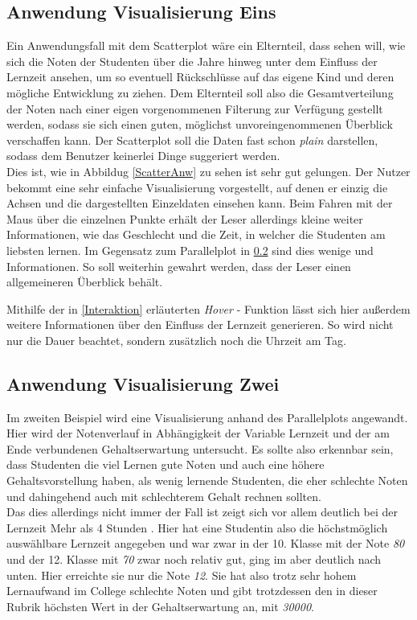 \documentclass[usegeometry=true]{scrartcl}
\begin{document}
\subsection{Anwendung Visualisierung Eins}
\label{AnwEins}
Ein Anwendungsfall mit dem Scatterplot wäre ein Elternteil, dass sehen will, wie sich die Noten der Studenten über die Jahre hinweg unter dem Einfluss der Lernzeit ansehen, um so eventuell Rückschlüsse auf das eigene Kind und deren mögliche Entwicklung zu ziehen. Dem Elternteil soll also die Gesamtverteilung der Noten nach einer eigen vorgenommenen Filterung zur Verfügung gestellt werden, sodass sie sich einen guten, möglichst unvoreingenommenen Überblick verschaffen kann. Der Scatterplot soll die Daten fast schon \textit{plain} darstellen, sodass dem Benutzer keinerlei Dinge suggeriert werden.\\

\noindent Dies ist, wie in Abbildug \ref{ScatterAnw} zu sehen ist sehr gut gelungen. Der Nutzer bekommt eine sehr einfache Visualisierung vorgestellt, auf denen er einzig die Achsen und die dargestellten Einzeldaten einsehen kann. Beim Fahren mit der Maus über die einzelnen Punkte erhält der Leser allerdings kleine weiter Informationen, wie das Geschlecht und die Zeit, in welcher die Studenten am liebsten lernen. Im Gegensatz zum Parallelplot in \ref{AnwZwei} sind dies wenige und Informationen. So soll weiterhin gewahrt werden, dass der Leser einen allgemeineren Überblick behält.


\noindent Mithilfe der in \ref{Interaktion} erläuterten \textit{Hover} - Funktion lässt sich hier außerdem weitere Informationen über den Einfluss der Lernzeit generieren. So wird nicht nur die Dauer beachtet, sondern zusätzlich noch die Uhrzeit am Tag.


\subsection{Anwendung Visualisierung Zwei}
\label{AnwZwei}
Im zweiten Beispiel wird eine Visualisierung anhand des Parallelplots angewandt. Hier wird der Notenverlauf in Abhängigkeit der Variable Lernzeit und der am Ende verbundenen Gehaltserwartung untersucht. Es sollte also erkennbar sein, dass Studenten die viel Lernen gute Noten und auch eine höhere Gehaltsvorstellung haben, als wenig lernende Studenten, die eher schlechte Noten und dahingehend auch mit schlechterem Gehalt rechnen sollten.\\

\noindent Das dies allerdings nicht immer der Fall ist zeigt sich vor allem deutlich bei der Lernzeit \glqq Mehr als 4 Stunden \grqq . Hier hat eine Studentin also die höchstmöglich auswählbare Lernzeit angegeben und war zwar in der 10. Klasse mit der Note \textit{80} und der 12. Klasse mit \textit{70} zwar noch relativ gut, ging im aber deutlich nach unten. Hier erreichte sie nur die Note \textit{12}. Sie hat also trotz sehr hohem Lernaufwand im College schlechte Noten und gibt trotzdessen den in dieser Rubrik höchsten Wert in der Gehaltserwartung an, mit \textit{30000}.\\
\end{document}
